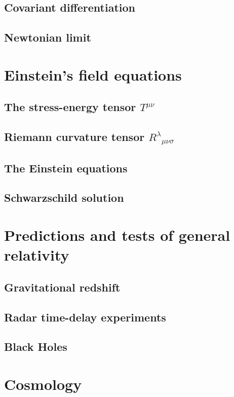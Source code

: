 \documentclass{article}
\theoremstyle{definition}
\begin{document}
\subsection{Covariant differentiation}
\subsection{Newtonian limit}

\newpage

\section{Einstein's field equations}
\subsection{The stress-energy tensor $T^{\mu\nu}$}
\subsection{Riemann curvature tensor $R^{\lambda}_{\text{ }\mu\nu\sigma}$}
\subsection{The Einstein equations}
\subsection{Schwarzschild solution}

\newpage

\section{Predictions and tests of general relativity}
\subsection{Gravitational redshift}
\subsection{Radar time-delay experiments}
\subsection{Black Holes}

\newpage

\section{Cosmology}
\end{document}
